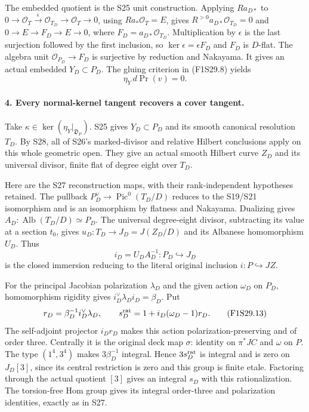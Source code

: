 The embedded quotient is the S25 unit construction.
Applying $Ra_{D*}$ to
$0\to\mathcal O_T\xrightarrow{\epsilon}\mathcal O_{T_D}
\to\mathcal O_T\to0$, using $Ra_*\mathcal O_T=E$, gives
$R^{>0}a_{D*}\mathcal O_{T_D}=0$ and
$0\to E\to F_D\to E\to0$, where
$F_D=a_{D*}\mathcal O_{T_D}$.
Multiplication by $\epsilon$ is the last surjection followed
by the first inclusion, so $\ker\epsilon=\epsilon F_D$ and
$F_D$ is $D$-flat. The algebra unit
$\mathcal O_{P_D}\to F_D$ is surjective by reduction and
Nakayama. It gives an actual embedded $Y_D\subset P_D$.
The gluing criterion in (F1S29.8) yields
\[
                       \eta_Y\,d\operatorname{Pr}(v)=0.
 \tag{F1S29.11}
\]

\paragraph{4. Every normal-kernel tangent recovers a cover tangent.}
Take $\kappa\in\ker(\eta_Y|_{\mathfrak D_P})$.
S25 gives $Y_D\subset P_D$ and its smooth canonical
resolution $T_D$. By S28, all of S26's marked-divisor
and relative Hilbert conclusions apply on this whole
geometric open. They give an actual smooth Hilbert
curve $Z_D$ and its universal divisor, finite flat of
degree eight over $T_D$.

Here are the S27 reconstruction maps, with their
rank-independent hypotheses retained. The pullback
$P_D^\vee\to\operatorname{Pic}^0(T_D/D)$ reduces to the
S19/S21 isomorphism and is an isomorphism by flatness and
Nakayama. Dualizing gives
$A_D:\operatorname{Alb}(T_D/D)\simeq P_D$.
The universal degree-eight divisor, subtracting its
value at a section $t_0$, gives $u_D:T_D\to J_D=J(Z_D/D)$
and its Albanese homomorphism $U_D$. Thus
\[
                  i_D=U_DA_D^{-1}:P_D\hookrightarrow J_D
 \tag{F1S29.12}
\]
is the closed immersion reducing to the literal original
inclusion $i:P\hookrightarrow JZ$.

For the principal Jacobian polarization $\lambda_D$ and
the given action $\omega_D$ on $P_D$, homomorphism rigidity
gives $i_D^\vee\lambda_Di_D=\beta_D$. Put
\[
 r_D=\beta_D^{-1}i_D^\vee\lambda_D,\qquad
 s_D^{\rm rat}=1+i_D(\omega_D-1)r_D.
 \tag{F1S29.13}
\]
The self-adjoint projector $i_Dr_D$ makes this action
polarization-preserving and of order three. Centrally
it is the original deck map $\sigma$: identity on
$\pi^*JC$ and $\omega$ on $P$.
The type $(1^4,3^4)$ makes $3\beta_D^{-1}$ integral.
Hence $3s_D^{\rm rat}$ is integral and is zero on
$J_D[3]$, since its central restriction is zero and
this group is finite etale. Factoring through the
actual quotient $[3]$ gives an integral $s_D$ with
this rationalization. The torsion-free Hom group
gives its integral order-three and polarization
identities, exactly as in S27.

